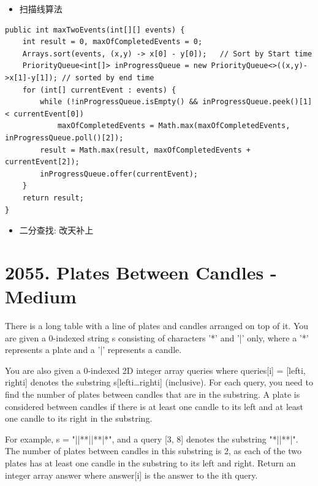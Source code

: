 \documentclass[9pt, b5paaper]{book}
\begin{document}
\begin{itemize}
\item 扫描线算法
\end{itemize}
\begin{verbatim}
public int maxTwoEvents(int[][] events) {
    int result = 0, maxOfCompletedEvents = 0;
    Arrays.sort(events, (x,y) -> x[0] - y[0]);   // Sort by Start time
    PriorityQueue<int[]> inProgressQueue = new PriorityQueue<>((x,y)->x[1]-y[1]); // sorted by end time
    for (int[] currentEvent : events) {
        while (!inProgressQueue.isEmpty() && inProgressQueue.peek()[1] < currentEvent[0])
            maxOfCompletedEvents = Math.max(maxOfCompletedEvents, inProgressQueue.poll()[2]);
        result = Math.max(result, maxOfCompletedEvents + currentEvent[2]);
        inProgressQueue.offer(currentEvent);
    }
    return result;
}
\end{verbatim}
\begin{itemize}
\item 二分查找: 改天补上
\end{itemize}

\section{2055. Plates Between Candles - Medium}
\label{sec-8-2}
There is a long table with a line of plates and candles arranged on top of it. You are given a 0-indexed string s consisting of characters '*' and '|' only, where a '*' represents a plate and a '|' represents a candle.

You are also given a 0-indexed 2D integer array queries where queries[i] = [lefti, righti] denotes the substring s[lefti\ldots{}righti] (inclusive). For each query, you need to find the number of plates between candles that are in the substring. A plate is considered between candles if there is at least one candle to its left and at least one candle to its right in the substring.

For example, s = "||**||**|*", and a query [3, 8] denotes the substring "*||**|". The number of plates between candles in this substring is 2, as each of the two plates has at least one candle in the substring to its left and right.
Return an integer array answer where answer[i] is the answer to the ith query.
\end{document}
